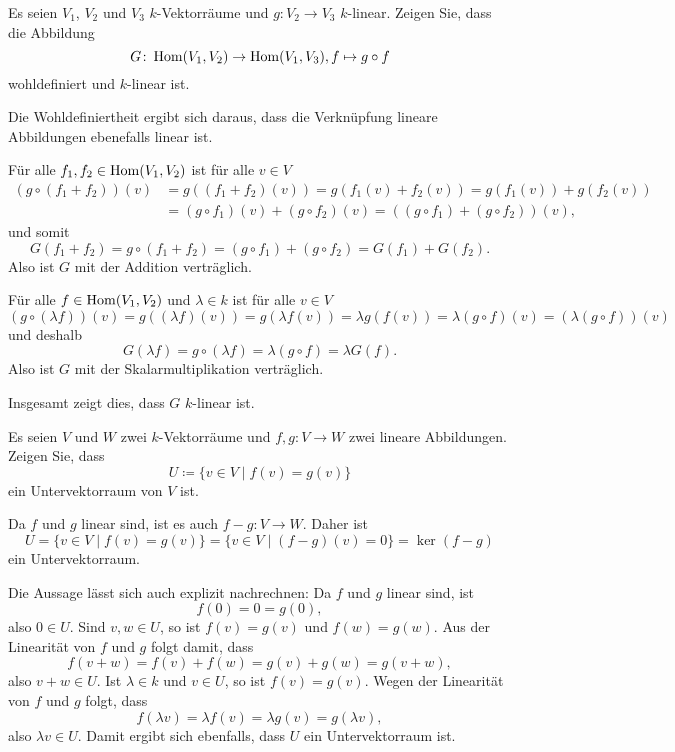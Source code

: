 \begin{question}
 Es seien $V_1$, $V_2$ und $V_3$ $k$-Vektorräume und $g \colon V_2 \to V_3$ $k$-linear. Zeigen Sie, dass die Abbildung
 \[
  G \colon \operatorname{Hom}(V_1, V_2) \to \operatorname{Hom}(V_1, V_3), f \mapsto g \circ f
 \]
 wohldefiniert und $k$-linear ist.
\end{question}
\begin{solution}
 Die Wohldefiniertheit ergibt sich daraus, dass die Verknüpfung lineare Abbildungen ebenefalls linear ist.
 
 Für alle $f_1, f_2 \in \operatorname{Hom}(V_1, V_2)$ ist für alle $v \in V$
 \begin{align*}
  (g \circ (f_1 + f_2))(v)
  &= g( (f_1 + f_2)(v) )
  = g( f_1(v) + f_2(v) )
  = g(f_1(v)) + g(f_2(v)) \\
  &= (g \circ f_1)(v) + (g \circ f_2)(v)
  = ((g \circ f_1) + (g \circ f_2))(v),
 \end{align*}
 und somit
 \[
  G(f_1 + f_2) = g \circ (f_1 + f_2) = (g \circ f_1) + (g \circ f_2) = G(f_1) + G(f_2).
 \]
 Also ist $G$ mit der Addition verträglich.
 
 Für alle $f \in \operatorname{Hom}(V_1, V_2)$ und $\lambda \in k$ ist für alle $v \in V$
 \[
  (g \circ (\lambda f))(v)
  = g((\lambda f)(v))
  = g(\lambda f(v))
  = \lambda g(f(v))
  = \lambda (g \circ f)(v)
  = (\lambda (g \circ f))(v)
 \]
 und deshalb
 \[
  G(\lambda f) = g \circ (\lambda f) = \lambda (g \circ f) = \lambda G(f).
 \]
 Also ist $G$ mit der Skalarmultiplikation verträglich.
 
 Insgesamt zeigt dies, dass $G$ $k$-linear ist.
\end{solution}


\begin{question}
 Es seien $V$ und $W$ zwei $k$-Vektorräume und $f, g \colon V \to W$ zwei lineare Abbildungen. Zeigen Sie, dass 
 \[
  U \coloneqq \{v \in V \mid f(v) = g(v)\}
 \]
 ein Untervektorraum von $V$ ist.
\end{question}
\begin{solution}
 Da $f$ und $g$ linear sind, ist es auch $f-g \colon V \to W$. Daher ist
 \[
  U
  = \{v \in V \mid f(v) = g(v)\} 
  = \{v \in V \mid (f-g)(v) = 0\}
  = \ker (f-g)
 \]
 ein Untervektorraum.
 
 Die Aussage lässt sich auch explizit nachrechnen: Da $f$ und $g$ linear sind, ist
 \[
  f(0) = 0 = g(0),
 \]
 also $0 \in U$. Sind $v, w \in U$, so ist $f(v) = g(v)$ und $f(w) = g(w)$. Aus der Linearität von $f$ und $g$ folgt damit, dass
 \[
  f(v+w) = f(v) + f(w) = g(v) + g(w) = g(v+w),
 \]
 also $v+w \in U$. Ist $\lambda \in k$ und $v \in U$, so ist $f(v) = g(v)$. Wegen der Linearität von $f$ und $g$ folgt, dass
 \[
  f(\lambda v) = \lambda f(v) = \lambda g(v) = g(\lambda v),
 \]
 also $\lambda v \in U$. Damit ergibt sich ebenfalls, dass $U$ ein Untervektorraum ist.
\end{solution}



